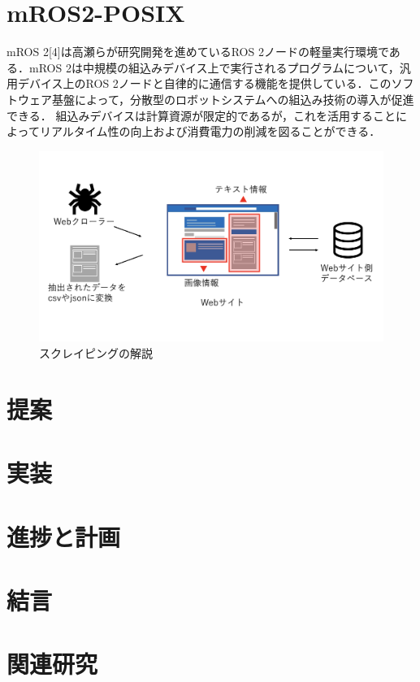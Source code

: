 \documentclass[11pt]{ujarticle}
\begin{document}
\section{mROS2-POSIX}
mROS 2[4]は高瀬らが研究開発を進めているROS 2ノードの軽量実行環境である．mROS 2は中規模の組込みデバイス上で実行されるプログラムについて，汎用デバイス上のROS 2ノードと自律的に通信する機能を提供している．このソフトウェア基盤によって，分散型のロボットシステムへの組込み技術の導入が促進できる．
組込みデバイスは計算資源が限定的であるが，これを活用することによってリアルタイム性の向上および消費電力の削減を図ることができる．


\begin{figure}[h]
	\includegraphics[width=0.9\linewidth]{./src/selenium.png}
	\caption{スクレイピングの解説}
  \label{fig:arch}
\end{figure}

\section{提案}


\section{実装}


\section{進捗と計画}


\section{結言}


\section{関連研究}
\end{document}
